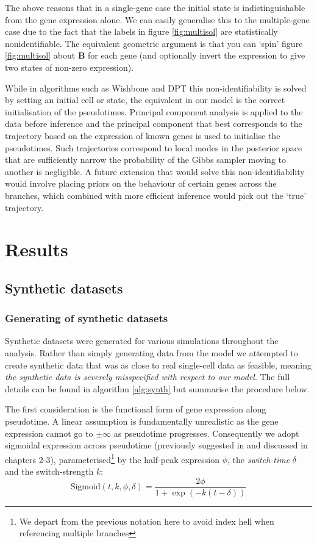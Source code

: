 The above reasons that in a single-gene case the initial state is indistinguishable from the gene expression alone. We can easily generalise this to the multiple-gene case due to the fact that the labels in figure \ref{fig:multisol} are statistically nonidentifiable. The equivalent geometric argument is that you can `spin' figure \ref{fig:multisol} about \textbf{B} for each gene (and optionally invert the expression to give two states of non-zero expression).

While in algorithms such as Wishbone and DPT this non-identifiability is solved by setting an initial cell or state, the equivalent in our model is the correct initialisation of the pseudotimes. Principal component analysis is applied to the data before inference and the principal component that best corresponds to the trajectory based on the expression of known genes is used to initialise the pseudotimes. Such trajectories correspond to local modes in the posterior space that are sufficiently narrow the probability of the Gibbs sampler moving to another is negligible. A future extension that would solve this non-identifiability would involve placing priors on the behaviour of certain genes across the branches, which combined with more efficient inference would pick out the `true' trajectory.


\section{Results}


\subsection{Synthetic datasets}

\subsubsection{Generating of synthetic datasets}

Synthetic datasets were generated for various simulations throughout the analysis. Rather than simply generating data from the model we attempted to create synthetic data that was as close to real single-cell data as feasible, meaning \emph{the synthetic data is severely misspecified with respect to our model}. The full details can be found in algorithm \ref{alg:synth} but summarise the procedure below.

The first consideration is the functional form of gene expression along pseudotime. A linear assumption is fundamentally unrealistic as the gene expression cannot go to $\pm \infty$ as pseudotime progresses. Consequently we adopt sigmoidal expression across pseudotime (previously suggested in \cite{campbell2016order,campbell2016switchde} and discussed in chapters 2-3), parameterised\footnote{We depart from the previous notation here to avoid index hell when referencing multiple branches} by the half-peak expression $\phi$, the \emph{switch-time} $\delta$ and the switch-strength $k$:
\begin{equation}\label{eq:sigmoid}
      \text{Sigmoid}(t, k, \phi, \delta)  = \frac{2 \phi}{1 + \exp(-k(t - \delta))}
\end{equation}

